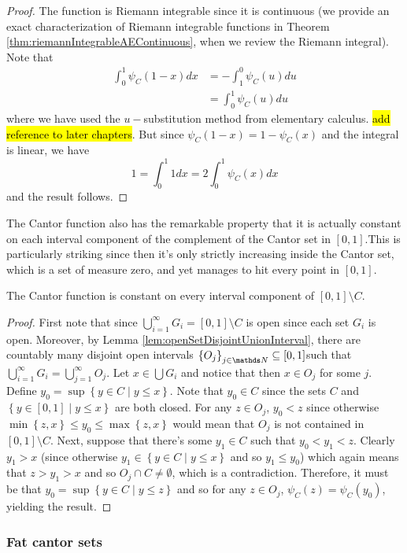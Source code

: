\begin{proof}
The function is Riemann integrable since it is continuous (we provide
an exact characterization of Riemann integrable functions in Theorem
\ref{thm:riemannIntegrableAEContinuous}, when we review the Riemann
integral). Note that 
\begin{align*}
\int_{0}^{1}\psi_{C}\left(1-x\right)dx & =-\int_{1}^{0}\psi_{C}\left(u\right)du\\
 & =\int_{0}^{1}\psi_{C}\left(u\right)du
\end{align*}
where we have used the $u-$substitution method from elementary calculus.
\hl{add reference to later chapters}. But since $\psi_{C}\left(1-x\right)=1-\psi_{C}\left(x\right)$
and the integral is linear, we have
\[
1=\int_{0}^{1}1dx=2\int_{0}^{1}\psi_{C}\left(x\right)dx
\]
 and the result follows.
\end{proof}
The Cantor function also has the remarkable property that it is actually
constant on each interval component of the complement of the Cantor
set in $\left[0,1\right].$This is particularly striking since then
it's only strictly increasing inside the Cantor set, which is a set
of measure zero, and yet manages to hit every point in $\left[0,1\right].$
\begin{prop}
\label{prop:cantorFunctionConstantOutside}The Cantor function is
constant on every interval component of $\left[0,1\right]\setminus C.$
\end{prop}

\begin{proof}
First note that since $\bigcup_{i=1}^{\infty}G_{i}=\left[0,1\right]\setminus C$
is open since each set $G_{i}$ is open. Moreover, by Lemma \ref{lem:openSetDisjointUnionInterval},
there are countably many disjoint open intervals $\left\{ O_{j}\right\} _{j\in\N}\subseteq\left[0,1\right]$such
that $\bigcup_{i=1}^{\infty}G_{i}=\bigcup_{j=1}^{\infty}O_{j}$. Let
$x\in\bigcup G_{i}$ and notice that then $x\in O_{j}$ for some $j.$
Define $y_{0}=\sup\left\{ y\in C\mid y\leq x\right\} $. Note that
$y_{0}\in C$ since the sets $C$ and $\left\{ y\in\left[0,1\right]\mid y\leq x\right\} $
are both closed. For any $z\in O_{j}$, $y_{0}<z$ since otherwise
$\min\left\{ z,x\right\} \leq y_{0}\leq\max\left\{ z,x\right\} $
would mean that $O_{j}$ is not contained in $\left[0,1\right]\setminus C$.
Next, suppose that there's some $y_{1}\in C$ such that $y_{0}<y_{1}<z$.
Clearly $y_{1}>x$ (since otherwise $y_{1}\in\left\{ y\in C\mid y\leq x\right\} $
and so $y_{1}\leq y_{0}$) which again means that $z>y_{1}>x$ and
so $O_{j}\cap C\neq\emptyset$, which is a contradiction. Therefore,
it must be that $y_{0}=\sup\left\{ y\in C\mid y\leq z\right\} $ and
so for any $z\in O_{j}$, $\psi_{C}\left(z\right)=\psi_{C}\left(y_{0}\right)$,
yielding the result.
\end{proof}

\subsubsection{Fat cantor sets}

